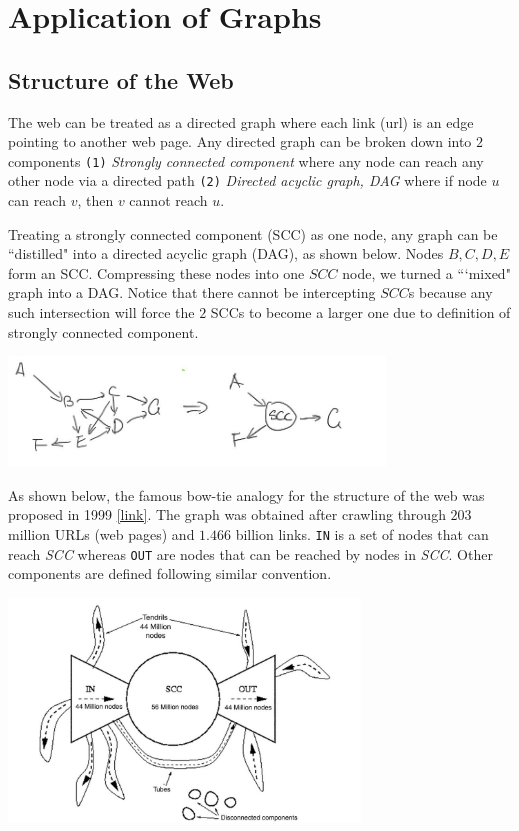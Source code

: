\section{Application of Graphs}

\subsection{Structure of the Web}

The web can be treated as a directed graph where each link (url) is an edge pointing to another web page. Any directed graph can be broken down into $2$ components \texttt{(1)} \textit{Strongly connected component} where any node can reach any other node via a directed path \texttt{(2)} \textit{Directed acyclic graph, DAG} where if node $u$ can reach $v$, then $v$ cannot reach $u$.

Treating a strongly connected component (SCC) as one node, any graph can be ``distilled" into a directed acyclic graph (DAG), as shown below. Nodes $B, C, D, E$ form an SCC. Compressing these nodes into one $SCC$ node, we turned a ```mixed" graph into a DAG. Notice that there cannot be intercepting $SCC$s because any such intersection will force the $2$ SCCs to become a larger one due to definition of strongly connected component. 

{
\centering
\includegraphics[width=0.75\textwidth]{notes/img/n3_scc.JPG} \par
}

As shown below, the famous bow-tie analogy for the structure of the web was proposed in 1999 \href{http://snap.stanford.edu/class/cs224w-readings/broder00bowtie.pdf}{[link]}. The graph was obtained after crawling through $203$ million URLs (web pages) and $1.466$ billion links. \texttt{IN} is a set of nodes that can reach \textit{SCC} whereas \texttt{OUT} are nodes that can be reached by nodes in \textit{SCC}. Other components are defined following similar convention.

{
\centering
\includegraphics[width=0.7\textwidth]{notes/img/n3_web.JPG} \par
}


